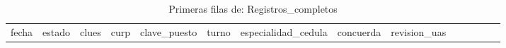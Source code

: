 \documentclass[
]{article}
\begin{document}
\begin{longtable}[]{@{}
  >{\raggedright\arraybackslash}p{}
  >{\raggedright\arraybackslash}p{}
  >{\raggedright\arraybackslash}p{}
  >{\raggedright\arraybackslash}p{}
  >{\raggedright\arraybackslash}p{}
  >{\raggedright\arraybackslash}p{}
  >{\raggedright\arraybackslash}p{}
  >{\raggedright\arraybackslash}p{}
  >{\raggedright\arraybackslash}p{}
  >{\raggedright\arraybackslash}p{}
  >{\raggedright\arraybackslash}p{}
  >{\raggedright\arraybackslash}p{}
  >{\raggedright\arraybackslash}p{}
  >{\raggedright\arraybackslash}p{}@{}}
\caption{Primeras filas de: Registros\_completos}\tabularnewline
\toprule\noalign{}
\begin{minipage}[b]{\linewidth}\raggedright
fecha
\end{minipage} & \begin{minipage}[b]{\linewidth}\raggedright
estado
\end{minipage} & \begin{minipage}[b]{\linewidth}\raggedright
clues
\end{minipage} & \begin{minipage}[b]{\linewidth}\raggedright
curp
\end{minipage} & \begin{minipage}[b]{\linewidth}\raggedright
clave\_puesto
\end{minipage} & \begin{minipage}[b]{\linewidth}\raggedright
turno
\end{minipage} & \begin{minipage}[b]{\linewidth}\raggedright
especialidad\_cedula
\end{minipage} & \begin{minipage}[b]{\linewidth}\raggedright
concuerda
\end{minipage} & \begin{minipage}[b]{\linewidth}\raggedright
revision\_uas
\end{minipage} & \begin{minipage}[b]{\linewidth}\raggedright

\end{minipage}
\end{longtable}
\end{document}
